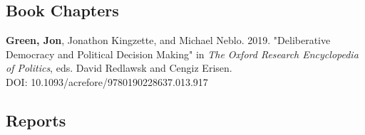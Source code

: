 \documentclass[letterpaper]{article}
\renewenvironment{itemize}{
  \begin{list}{}{
    \setlength{\leftmargin}{1.5em}
  }
}{
  \end{list}
}
\begin{document}
\subsection*{Book Chapters}

\begin{itemize}
\item \textbf{Green, Jon}, Jonathon Kingzette, and Michael Neblo. 2019. "Deliberative Democracy and Political Decision Making" in \textit{The Oxford Research Encyclopedia of Politics}, eds. David Redlawsk and Cengiz Erisen.\\
DOI: 10.1093/acrefore/9780190228637.013.917
\end{itemize}

\subsection*{Reports}
\end{document}

